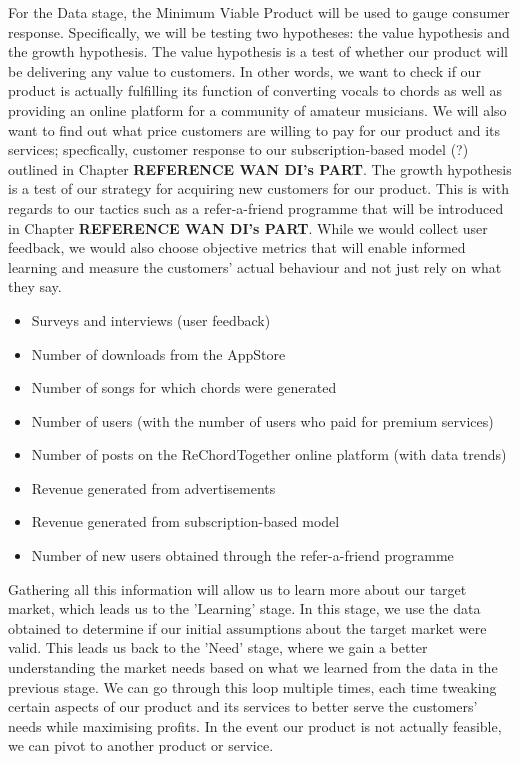 For the Data stage, the Minimum Viable Product will be used to gauge consumer response. Specifically, we will be testing two hypotheses: the value hypothesis and the growth hypothesis. The value hypothesis is a test of whether our product will be delivering any value to customers. In other words, we want to check if our product is actually fulfilling its function of converting vocals to chords as well as providing an online platform for a community of amateur musicians. We will also want to find out what price customers are willing to pay for our product and its services; specfically, customer response to our subscription-based model (?) outlined in Chapter \textbf{REFERENCE WAN DI's PART}.  The growth hypothesis is a test of our strategy for acquiring new customers for our product. This is with regards to our tactics such as a refer-a-friend programme that will be introduced in Chapter \textbf{REFERENCE WAN DI's PART}. While we would collect user feedback, we would also choose objective metrics that will enable informed learning and measure the customers' actual behaviour and not just rely on what they say.

\begin{itemize}
    \item Surveys and interviews (user feedback)
    \item Number of downloads from the AppStore
    \item Number of songs for which chords were generated
    \item Number of users (with the number of users who paid for premium services)
    \item Number of posts on the ReChordTogether online platform (with data trends)
    \item Revenue generated from advertisements
    \item Revenue generated from subscription-based model
    \item Number of new users obtained through the refer-a-friend programme
  \end{itemize}

  Gathering all this information will allow us to learn more about our target market, which leads us to the 'Learning' stage. In this stage, we use the data obtained to determine if our initial assumptions about the target market were valid. This leads us back to the 'Need' stage, where we gain a better understanding the market needs based on what we learned from the data in the previous stage. We can go through this loop multiple times, each time tweaking certain aspects of our product and its services to better serve the customers' needs while maximising profits. In the event our product is not actually feasible, we can pivot to another product or service.

